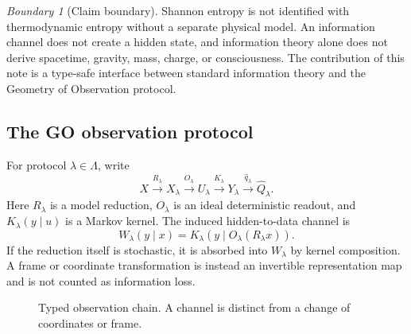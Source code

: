 \documentclass[11pt,a4paper]{article}
\theoremstyle{definition}
\theoremstyle{plain}
\theoremstyle{remark}
\newtheorem{warning}[definition]{Boundary}
\newcommand{\1}{\mathbf{1}}
\begin{document}
\begin{warning}[Claim boundary]
Shannon entropy is not identified with thermodynamic entropy without a
separate physical model. An information channel does not create a hidden
state, and information theory alone does not derive spacetime, gravity,
mass, charge, or consciousness. The contribution of this note is a
type-safe interface between standard information theory and the Geometry
of Observation protocol.
\end{warning}

\subsection{The GO observation protocol}

For protocol $\lambda\in\Lambda$, write
\[
X
\xrightarrow{R_\lambda}
X_\lambda
\xrightarrow{O_\lambda}
U_\lambda
\xrightarrow{K_\lambda}
Y_\lambda
\xrightarrow{\widehat q_\lambda}
\widehat Q_\lambda .
\]
Here $R_\lambda$ is a model reduction, $O_\lambda$ is an ideal
deterministic readout, and $K_\lambda(y\mid u)$ is a Markov kernel. The
induced hidden-to-data channel is
\begin{equation}
W_\lambda(y\mid x)
=
K_\lambda\!\left(y\mid O_\lambda(R_\lambda x)\right).
\label{eq:induced-channel}
\end{equation}
If the reduction itself is stochastic, it is absorbed into $W_\lambda$ by
kernel composition. A frame or coordinate transformation is instead an
invertible representation map and is not counted as information loss.

\begin{figure}[htbp]
\centering
{}
\caption{Typed observation chain. A channel is distinct from a change of
coordinates or frame.}
\label{fig:pipeline}
\end{figure}
\end{document}
